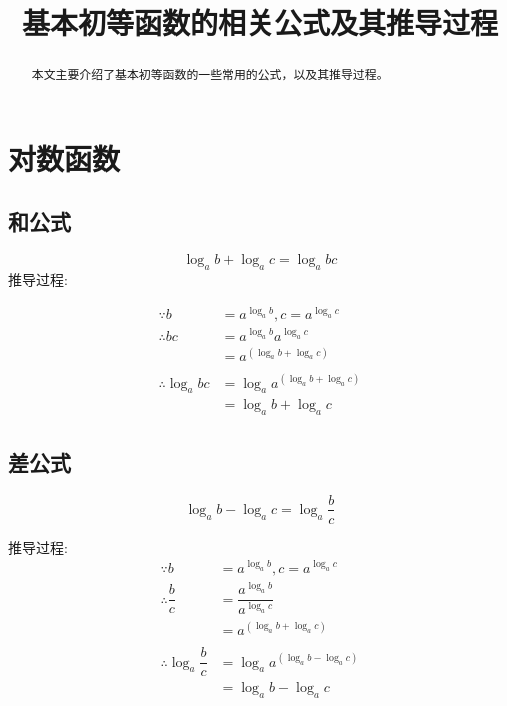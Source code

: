 \documentclass[a4paper, 12pt, draft]{article}
\title{基本初等函数的相关公式及其推导过程}
\author{}
\date{}
\begin{document}
\maketitle
\tableofcontents

\begin{abstract}
    本文主要介绍了基本初等函数的一些常用的公式，以及其推导过程。
\end{abstract}

\newpage
\section{对数函数}
    \subsection{和公式}
    \begin{equation}\label{eq1.1}
        \log_a{b} + \log_a{c} = \log_a{bc}
    \end{equation}
    推导过程:

    \begin{equation*}
        \begin{aligned}
            \because   b  &= a^{\log_{a}{b}}, c = a^{\log_{a}{c}}   \\
            \therefore bc &= a^{\log_{a}{b}} a^{\log_{a}{c}}        \\
                          &= a^{(\log_{a}{b} + \log_{a}{c})}        \\
                                                                    &\\
            \therefore \log_{a}{bc} &= \log_{a}{a^{(\log_{a}{b} + \log_{a}{c})}} \\
                                    &= \log_{a}{b} + \log_{a}{c}
        \end{aligned}    
    \end{equation*} 

    \subsection{差公式}
    \begin{equation}\label{eq1.2}
        \log_{a}{b} - \log_{a}{c} = \log_{a}{ \dfrac{b}{c} }
    \end{equation}
    
    推导过程:
    \[
    \begin{aligned}
        \because   b            &= a^{\log_{a}{b}}, c = a^{\log_{a}{c}}     \\
        \therefore \dfrac{b}{c}  &= \dfrac{a^{\log_{a}{b}}}{a^{\log_{a}{c}}}  \\
                                &= a^{(\log_{a}{b} + \log_{a}{c})}          \\
                                &                                           \\
        \therefore \log_{a}{\dfrac{b}{c}} &= \log_{ a }{ a ^ {(\log_{a}{b}-\log_{a}{c})} } \\
                                &= \log_{a}{b} - \log_{a}{c}
    \end{aligned}
    \]
\end{document}
